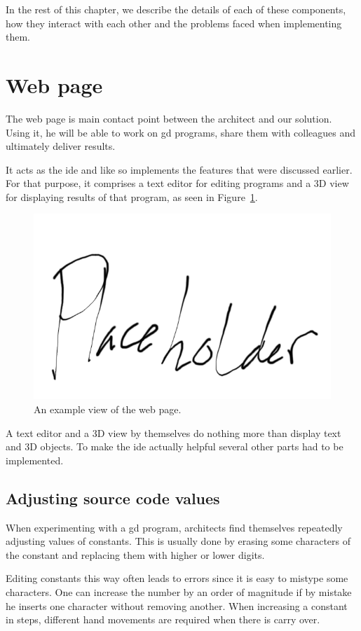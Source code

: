 In the rest of this chapter, we describe the details of each of these components, how they interact with each other and the problems faced when implementing them.


\section{Web page}
The web page is main contact point between the architect and our solution.
Using it, he will be able to work on \gls{gd} programs, share them with colleagues and ultimately deliver results.

It acts as the \gls{ide} and like so implements the features that were discussed earlier.
For that purpose, it comprises a text editor for editing programs and a 3D view for displaying results of that program, as seen in Figure~\ref{fig:page:view}.

\begin{figure}
  \centering
  \includegraphics[width=12cm]{./images/webpage_view}
  \caption{An example view of the web page.}
  \label{fig:page:view}
\end{figure}

A text editor and a 3D view by themselves do nothing more than display text and 3D objects.
To make the \gls{ide} actually helpful several other parts had to be implemented.

\subsection{Adjusting source code values}
When experimenting with a \gls{gd} program, architects find themselves repeatedly adjusting values of constants.
This is usually done by erasing some characters of the constant and replacing them with higher or lower digits.

Editing constants this way often leads to errors since it is easy to mistype some characters.
One can increase the number by an order of magnitude if by mistake he inserts one character without removing another.
When increasing a constant in steps, different hand movements are required when there is carry over.

